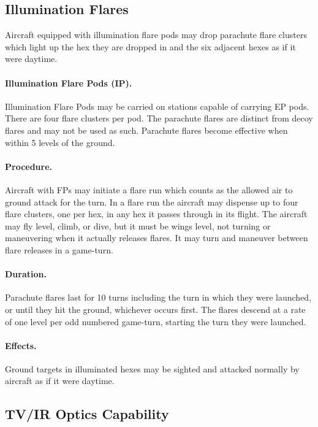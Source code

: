 \begin{advancedrules}
{\subsection{Illumination Flares}

Aircraft equipped with illumination flare pods may drop parachute flare clusters which light up the hex they are dropped in and the six adjacent hexes as if it were daytime.

\paragraph{Illumination Flare Pods (IP).} Illumination Flare Pods may be carried on stations capable of carrying EP pods. There are four flare clusters per pod. The parachute flares are distinct from decoy flares and may not be used as such. Parachute flares become effective when within 5 levels of the ground.

\paragraph{Procedure.} Aircraft with FPs may initiate a flare run which counts as the allowed air to ground attack for the turn. In a flare run the aircraft may dispense up to four flare clusters, one per hex, in any hex it passes through in its flight. The aircraft may fly level, climb, or dive, but it must be wings level, not turning or maneuvering when it actually releases flares. It may turn and maneuver between flare releases in a game-turn.

\paragraph{Duration.} Parachute flares last for 10 turns including the turn in which they were launched, or until they hit the ground, whichever occurs first. The flares descend at a rate of one level per odd numbered game-turn, starting the turn they were launched.

\paragraph{Effects.} Ground targets in illuminated hexes may be sighted and attacked normally by aircraft as if it were daytime.

\subsection{TV/IR Optics Capability}

}
\end{advancedrules}

